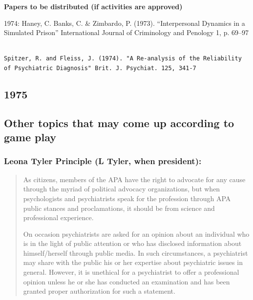 \textbf{Papers to be distributed (if activities are approved)}

1974: Haney, C. Banks, C. \& Zimbardo, P. (1973). ``Interpersonal Dynamics in a Simulated Prison'' International Journal of Criminology and Penology 1, p. 69--97 

\begin{adjustwidth}{2.5em}{2.5em}
\begin{verbatim}

Spitzer, R. and Fleiss, J. (1974). "A Re-analysis of the Reliability of Psychiatric Diagnosis" Brit. J. Psychiat. 125, 341-7

\end{verbatim}
\end{adjustwidth}

\newpage

\subsection{1975}
\label{1975}

\newpage

\subsection{Other topics that may come up according to game play}
\label{othertopicsthatmaycomeupaccordingtogameplay}

\subsubsection{Leona Tyler Principle (L Tyler, when president):}
\label{leonatylerprincipleltylerwhenpresident:}

\begin{quote}

As citizens, members of the APA have the right to advocate for any cause through the myriad of political advocacy organizations, but when psychologists and psychiatrists speak for the profession through APA public stances and proclamations, it should be from science and professional experience. 

On occasion psychiatrists are asked for an opinion about an individual who is in the light of public attention or who has disclosed information about himself\slash herself through public media. In such circumstances, a psychiatrist may share with the public his or her expertise about psychiatric issues in general. However, it is unethical for a psychiatrist to offer a professional opinion unless he or she has conducted an examination and has been granted proper authorization for such a statement.
\end{quote}

